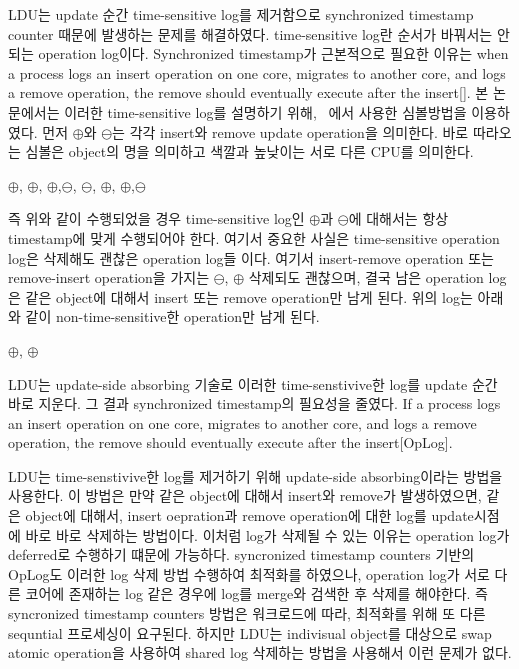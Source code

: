 \ifkor
LDU는 update 순간 time-sensitive log를 제거함으로 synchronized timestamp counter 때문에 발생하는
문제를 해결하였다.
time-sensitive log란 순서가 바꿔서는 안되는 operation log이다. 
Synchronized timestamp가 근본적으로 필요한 이유는 when a process logs an insert
operation on one core, migrates to another core, and logs a remove operation, the remove should
eventually execute after the insert[]. 
본 논문에서는 이러한 time-sensitive log를 설명하기 위해, ~\cite{Clements15SCR}에서 사용한 심볼방법을
이용하였다.
먼저 $\oplus$와 $\ominus$는 각각 insert와 remove update operation을 의미한다.
바로 따라오는 심볼은 object의 명을 의미하고 색깔과 높낮이는 서로 다른 CPU를 의미한다.
\begin{center}
$\oplus$, $\oplus$, $\oplus$,$\ominus$,
$\ominus$, $\oplus$, $\oplus$,$\ominus$
\end{center}
즉 위와 같이 수행되었을 경우 time-sensitive log인 $\oplus$과 $\ominus$에
대해서는 항상 timestamp에 맞게 수행되어야 한다.
여기서 중요한 사실은 time-sensitive operation log은 삭제해도 괜찮은 operation log들 이다.
여기서 insert-remove operation 또는 remove-insert operation을 가지는 
$\ominus$, $\oplus$ 삭제되도 괜찮으며, 결국 남은 operation log은 같은
object에 대해서 insert 또는 remove operation만 남게 된다.
위의 log는 아래와 같이 non-time-sensitive한 operation만 남게 된다.
\begin{center}
 $\oplus$, $\oplus$
\end{center}
LDU는 update-side absorbing 기술로 이러한 time-senstivive한 log를 update 순간 바로
지운다.
그 결과 synchronized timestamp의 필요성을 줄였다.
\else
If a process logs an insert operation on one core,
migrates to another core, and logs a remove operation, the remove should
eventually execute after the insert[OpLog].
\fi


\ifkor
LDU는 time-senstivive한 log를 제거하기 위해 update-side absorbing이라는 방법을 사용한다.
이 방법은 만약 같은 object에 대해서 insert와 remove가 발생하였으면, 같은 object에
대해서, insert oepration과 remove operation에 대한 log를 update시점에 바로 바로 삭제하는 방법이다. 
이처럼 log가 삭제될 수 있는 이유는 operation log가 deferred로 수행하기 떄문에 가능하다. 
syncronized timestamp counters 기반의 OpLog도 이러한 log 삭제 방법 수행하여 최적화를 하였으나,
operation log가 서로 다른 코어에 존재하는 log 같은 경우에 log를 merge와 검색한 후 삭제를 해야한다. 
즉 syncronized timestamp counters 방법은 워크로드에 따라, 최적화를 위해 또 다른 sequntial 프로세싱이
요구된다.
하지만 LDU는 indivisual object를 대상으로 swap atomic operation을 사용하여
shared log 삭제하는 방법을 사용해서 이런 문제가 없다.

